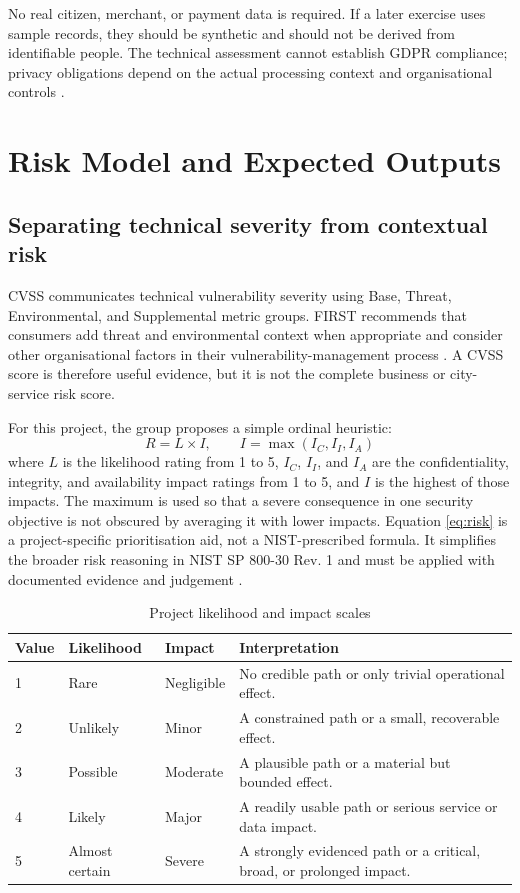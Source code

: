 \documentclass[11pt,a4paper]{article}
\begin{document}
No real citizen, merchant, or payment data is required. If a later exercise uses sample records, they should be synthetic and should not be derived from identifiable people. The technical assessment cannot establish GDPR compliance; privacy obligations depend on the actual processing context and organisational controls \citep{eu2016gdpr,mccallister2010}.

\section{Risk Model and Expected Outputs}
\subsection{Separating technical severity from contextual risk}
CVSS communicates technical vulnerability severity using Base, Threat, Environmental, and Supplemental metric groups. FIRST recommends that consumers add threat and environmental context when appropriate and consider other organisational factors in their vulnerability-management process \citep{first2023}. A CVSS score is therefore useful evidence, but it is not the complete business or city-service risk score.

For this project, the group proposes a simple ordinal heuristic:
\begin{equation}
R = L \times I,\qquad I = \max(I_C,I_I,I_A)
\label{eq:risk}
\end{equation}
where \(L\) is the likelihood rating from 1 to 5, \(I_C\), \(I_I\), and \(I_A\) are the confidentiality, integrity, and availability impact ratings from 1 to 5, and \(I\) is the highest of those impacts. The maximum is used so that a severe consequence in one security objective is not obscured by averaging it with lower impacts. Equation \ref{eq:risk} is a project-specific prioritisation aid, not a NIST-prescribed formula. It simplifies the broader risk reasoning in NIST SP 800-30 Rev. 1 and must be applied with documented evidence and judgement \citep{jointtaskforce2012}.

\begin{table}[H]
\centering
\caption{Project likelihood and impact scales}
\label{tab:scales}
\small
\begin{tabularx}{\textwidth}{L{1.7cm}L{2.4cm}YY}
\toprule
\textbf{Value} & \textbf{Likelihood} & \textbf{Impact} & \textbf{Interpretation}\\
 & Rare & Negligible & No credible path or only trivial operational effect.\\
2 & Unlikely & Minor & A constrained path or a small, recoverable effect.\\
3 & Possible & Moderate & A plausible path or a material but bounded effect.\\
4 & Likely & Major & A readily usable path or serious service or data impact.\\
5 & Almost certain & Severe & A strongly evidenced path or a critical, broad, or prolonged impact.\\
\bottomrule
\end{tabularx}
\end{table}
\end{document}
